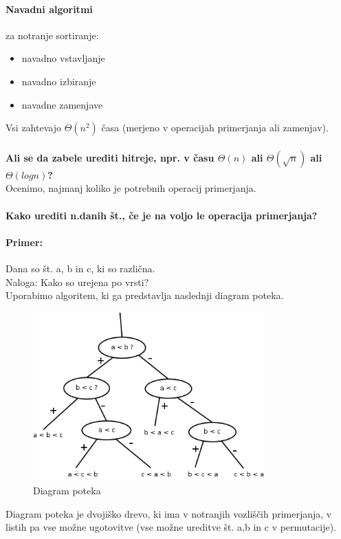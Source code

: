 \documentclass[a4paper,10pt]{article}
\begin{document}
\paragraph{Navadni algoritmi} za notranje sortiranje:
\begin{itemize}
	\item navadno vstavljanje
	\item navadno izbiranje
	\item navadne zamenjave
\end{itemize}
Vsi zahtevajo $\Theta(n^2)$ \v casa (merjeno v operacijah primerjanja ali zamenjav).\\
\\
\textbf{Ali se da zabele urediti hitreje, npr. v \v casu $\Theta(n)$ ali $\Theta(\sqrt{n})$ ali $\Theta(logn)$?}\\
Ocenimo, najmanj koliko je potrebnih operacij primerjanja.\\
\\
\textbf{Kako urediti n.danih \v st., \v ce je na voljo le operacija primerjanja?}

\paragraph{Primer:}
Dana so \v st. a, b in c, ki so razli\v cna.\\
Naloga: Kako so urejena po vrsti?\\
Uporabimo algoritem, ki ga predstavlja naslednji diagram poteka.
\begin{figure}[h]
	\centering
	\includegraphics[width=8.9cm,height=6.5cm]{Slike/DvojiskoDrevoUrejanja.png}
	\caption{Diagram poteka}
\end{figure}
Diagram poteka je dvoji\v sko drevo, ki ima v notranjih vozli\v s\v cih primerjanja, v listih pa vse mo\v zne ugotovitve (vse mo\v zne ureditve \v st. a,b in c v permutacije).
\end{document}
